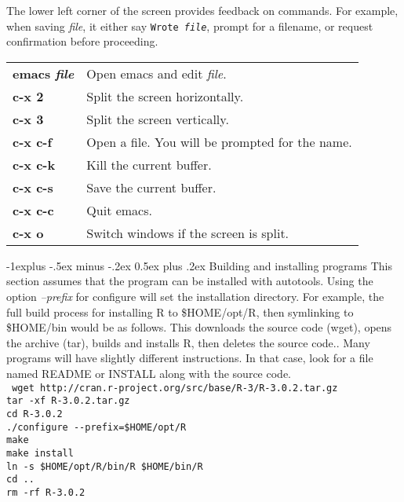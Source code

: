 \documentclass[10pt,landscape]{article}
\makeatletter
\renewcommand{\subsection}{\@startsection{subsection}{2}{0mm}%
                                {-1explus -.5ex minus -.2ex}%
                                {0.5ex plus .2ex}%
                                {\normalfont\normalsize\bfseries}}
\makeatother
\begin{document}
\begin{multicols}{3}
The lower left corner of the screen provides feedback on commands. For example, when saving \textit{file}, it either say \texttt{Wrote \textit{file}}, prompt for a filename, or request confirmation before proceeding.
\begin{tabular}{@{}p{\the\MyLen}%
                @{}p{\linewidth-\the\MyLen}@{}}
\textbf{emacs \textit{file}} & Open emacs and edit \textit{file}.\\
\textbf{c-x 2} & Split the screen horizontally.\\
\textbf{c-x 3} & Split the screen vertically.\\
\textbf{c-x c-f} & Open a file. You will be prompted for the name.\\
\textbf{c-x c-k} & Kill the current buffer.\\
\textbf{c-x c-s} & Save the current buffer.\\
\textbf{c-x c-c} & Quit emacs.\\
\textbf{c-x o} & Switch windows if the screen is split.\\
\end{tabular}

\subsection{Building and installing programs}
This section assumes that the program can be installed with autotools. Using the option \textit{--prefix} for configure will set the installation directory. For example, the full build process for installing R to \$HOME/opt/R, then symlinking to \$HOME/bin would be as follows. This downloads the source code (wget), opens the archive (tar), builds and installs R, then deletes the source code.. Many programs will have slightly different instructions. In that case, look for a file named README or INSTALL along with the source code.\\
\texttt{
\scriptsize{wget http://cran.r-project.org/src/base/R-3/R-3.0.2.tar.gz}\\
tar -xf R-3.0.2.tar.gz\\
cd R-3.0.2\\
./configure -{}-prefix=\$HOME/opt/R\\
make\\
make install\\
ln -s \$HOME/opt/R/bin/R \$HOME/bin/R\\
cd ..\\
rm -rf R-3.0.2\\
}


\end{multicols}
\end{document}

